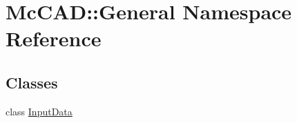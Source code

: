 \hypertarget{namespaceMcCAD_1_1General}{}\section{Mc\+C\+AD\+:\+:General Namespace Reference}
\label{namespaceMcCAD_1_1General}
\subsection*{Classes}
\begin{DoxyCompactItemize}
\item 
class \hyperlink{classMcCAD_1_1General_1_1InputData}{Input\+Data}
\end{DoxyCompactItemize}
